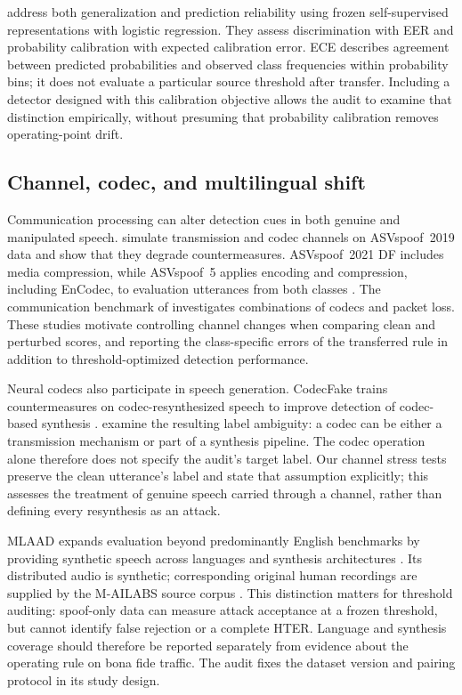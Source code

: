 \citet{pascu24_calibrated} address both generalization and prediction reliability using frozen self-supervised
representations with logistic regression. They assess discrimination with EER and probability calibration with
expected calibration error. ECE describes agreement between predicted probabilities and observed class frequencies
within probability bins; it does not evaluate a particular source threshold after transfer. Including a detector designed
with this calibration objective allows the audit to examine that distinction empirically, without presuming that
probability calibration removes operating-point drift.

\subsection{Channel, codec, and multilingual shift}
Communication processing can alter detection cues in both genuine and manipulated speech. \citet{zhang21_channel}
simulate transmission and codec channels on ASVspoof~2019 data and show that they degrade countermeasures. ASVspoof~2021 DF
includes media compression, while ASVspoof~5 applies encoding and compression, including EnCodec, to evaluation
utterances from both classes \citep{liu23_asvspoof2021,wang25_asvspoof5_db}. The communication benchmark of
\citet{realworld_comms24} investigates combinations of codecs and packet loss. These studies motivate controlling
channel changes when comparing clean and perturbed scores, and reporting the class-specific errors of the
transferred rule in addition to threshold-optimized detection performance.

Neural codecs also participate in speech generation. CodecFake trains countermeasures on codec-resynthesized
speech to improve detection of codec-based synthesis \citep{wu24_codecfake}.
\citet{xiao26_resynth} examine the resulting label ambiguity: a codec can be either a transmission mechanism or
part of a synthesis pipeline. The codec operation alone therefore does not specify the audit's target label.
Our channel stress tests preserve the clean utterance's label and state that assumption explicitly; this assesses
the treatment of genuine speech carried through a channel, rather than defining every resynthesis as an attack.

MLAAD expands evaluation beyond predominantly English benchmarks by providing synthetic speech across languages
and synthesis architectures \citep{mlaad24}. Its distributed audio is synthetic; corresponding original human
recordings are supplied by the M-AILABS source corpus \citep{solak17_mailabs}. This distinction matters for threshold auditing: spoof-only
data can measure attack acceptance at a frozen threshold, but cannot identify false rejection or a complete HTER.
Language and synthesis coverage should therefore be reported separately from evidence about the operating rule on
bona fide traffic. The audit fixes the dataset version and pairing protocol in its study design.

